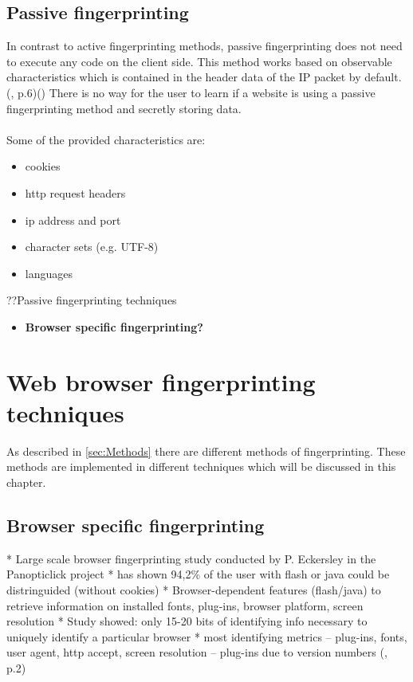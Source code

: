 \subsection{Passive fingerprinting}
In contrast to active fingerprinting methods, passive fingerprinting does not need to execute any code on the client side. This method works based on observable characteristics which is contained in the header data of the IP packet by default. (\textcite{doty18}, p.6)(\textcite{web17}) There is no way for the user to learn if a website is using a passive fingerprinting method and secretly storing data.\\\\
Some of the provided characteristics are:
\begin{itemize}
	\item cookies
	\item http request headers
	\item ip address and port
	\item character sets (e.g. UTF-8)
	\item languages\\
\end{itemize}
??Passive fingerprinting techniques
\begin{itemize}
	\item \textbf{Browser specific fingerprinting?}
\end{itemize}


\section{Web browser fingerprinting techniques}
As described in \autoref{sec:Methods} there are different methods of fingerprinting. These methods are implemented in different techniques which will be discussed in this chapter.
\subsection{Browser specific fingerprinting}

* Large scale browser fingerprinting study conducted by P. Eckersley in the Panopticlick project
* has shown 94,2\% of the user with flash or java could be distringuided (without cookies)
* Browser-dependent features (flash/java) to retrieve information on installed fonts, plug-ins, browser platform, screen resolution
* Study showed: only 15-20 bits of identifying info necessary to uniquely identify a particular browser
* most identifying metrics – plug-ins, fonts, user agent, http accept, screen resolution – plug-ins due to version numbers
(\textcite{upi15}, p.2)

